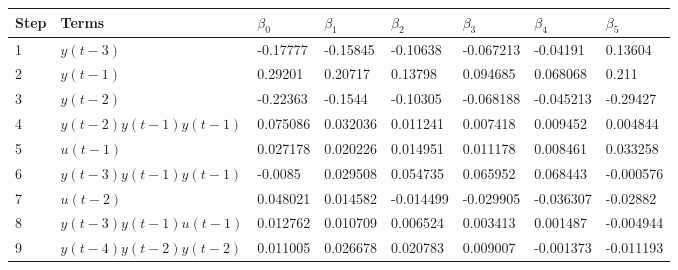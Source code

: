 \begin{tabular}{llllllll}
Step & Terms & $\beta_{0}$ & $\beta_{1}$ & $\beta_{2}$ & $\beta_{3}$ & $\beta_{4}$ & $\beta_{5}$ \\ 
\hline 
1 & $y(t-3)$ & -0.17777 & -0.15845 & -0.10638 & -0.067213 & -0.04191 & 0.13604 \\ 
2 & $y(t-1)$ & 0.29201 & 0.20717 & 0.13798 & 0.094685 & 0.068068 & 0.211 \\ 
3 & $y(t-2)$ & -0.22363 & -0.1544 & -0.10305 & -0.068188 & -0.045213 & -0.29427 \\ 
4 & $y(t-2)y(t-1)y(t-1)$ & 0.075086 & 0.032036 & 0.011241 & 0.007418 & 0.009452 & 0.004844 \\ 
5 & $u(t-1)$ & 0.027178 & 0.020226 & 0.014951 & 0.011178 & 0.008461 & 0.033258 \\ 
6 & $y(t-3)y(t-1)y(t-1)$ & -0.0085 & 0.029508 & 0.054735 & 0.065952 & 0.068443 & -0.000576 \\ 
7 & $u(t-2)$ & 0.048021 & 0.014582 & -0.014499 & -0.029905 & -0.036307 & -0.02882 \\ 
8 & $y(t-3)y(t-1)u(t-1)$ & 0.012762 & 0.010709 & 0.006524 & 0.003413 & 0.001487 & -0.004944 \\ 
9 & $y(t-4)y(t-2)y(t-2)$ & 0.011005 & 0.026678 & 0.020783 & 0.009007 & -0.001373 & -0.011193 \\ 
\hline 
\end{tabular}